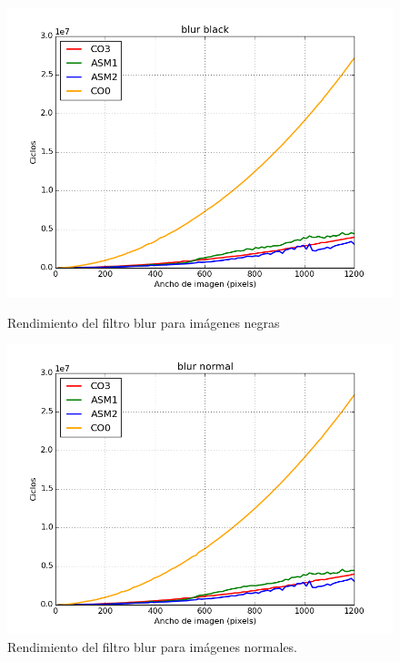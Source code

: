 \documentclass[a4paper]{article}
\begin{document}
\begin{figure}[H]
	\begin{center}
		\includegraphics[scale=0.4]{../tp2-bundle.v2/Testing/plots/all/blur-black--all.png}
		\caption{Rendimiento del filtro blur para imágenes negras}
		\label{fig:exp1-5}
	\end{center}
	\endminipage\hfill
	\begin{center}
		\includegraphics[scale=0.4]{../tp2-bundle.v2/Testing/plots/all/blur-normal--all.png}
		\caption{Rendimiento del filtro blur para imágenes normales.}
		\label{fig:exp1-2}
	\end{center}
	\endminipage\hfill
\end{figure}
\end{document}
